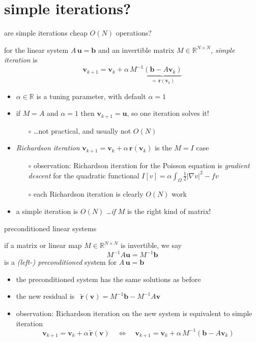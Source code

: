 \documentclass[10pt,
               svgnames,
               hyperref={colorlinks,citecolor=DeepPink4,linkcolor=FireBrick,urlcolor=Maroon},
               usepdftitle=false]{beamer}
\newcommand{\bb}{\mathbf{b}}
\newcommand{\br}{\mathbf{r}}
\newcommand{\bu}{\mathbf{u}}
\newcommand{\bv}{\mathbf{v}}
\newcommand{\RR}{\mathbb{R}}
\newcommand{\grad}{\nabla}
\begin{document}
\section{simple iterations?}

\begin{frame}{are simple iterations cheap $O(N)$ operations?}

\begin{definition} for the linear system $A\,\bu=\bb$ and an invertible matrix $M\in \RR^{N\times N}$, \emph{simple iteration} is
    $$\bv_{k+1} = \bv_k + \alpha\, M^{-1} \underbrace{\left(\bb - A \bv_k\right)}_{=\,\br(\bv_k)}$$
\end{definition}

\begin{itemize}
\item $\alpha\in\RR$ is a tuning parameter, with default $\alpha=1$
\item if $M=A$ and $\alpha=1$ then $\bv_{k+1}=\bu$, so one iteration solves it!
	\begin{itemize}
	\item[$\circ$] \dots not practical, and usually not $O(N)$
	\end{itemize}
\item \emph{Richardson iteration} \quad $\bv_{k+1} = \bv_k + \alpha\, \br(\bv_k)$ \quad is the $M=I$ case
	\begin{itemize}
	\item[$\circ$] observation: Richardson iteration for the Poisson equation is \emph{gradient descent} for the quadratic functional \quad $\displaystyle I[v] = \alpha \int_\Omega \frac{1}{2} |\grad v|^2 - f v$
	\item[$\circ$] each Richardson iteration is clearly $O(N)$ work
	\end{itemize}

\medskip
\item a simple iteration is $O(N)$ \dots \emph{if} $M$ is the right kind of matrix!
\end{itemize}
\end{frame}


\begin{frame}{preconditioned linear systems}

\begin{definition} if a matrix or linear map $M \in \RR^{N\times N}$ is invertible, we say
    $$M^{-1} A \bu = M^{-1} \bb$$
is a \emph{(left-) preconditioned} system for $A\,\bu=\bb$
\end{definition}

\begin{itemize}
\item the preconditioned system has the same solutions as before
\item the new residual is \, $\tilde{\br}(\bv) = M^{-1} \bb - M^{-1} A \bv$
\item observation: Richardson iteration on the new system is equivalent to simple iteration
    $$\bv_{k+1} = \bv_k + \alpha\, \tilde{\br}(\bv) \quad \iff \quad \bv_{k+1} = \bv_k + \alpha\, M^{-1} \left(\bb - A \bv_k\right)$$
\end{itemize}
\end{frame}
\end{document}
